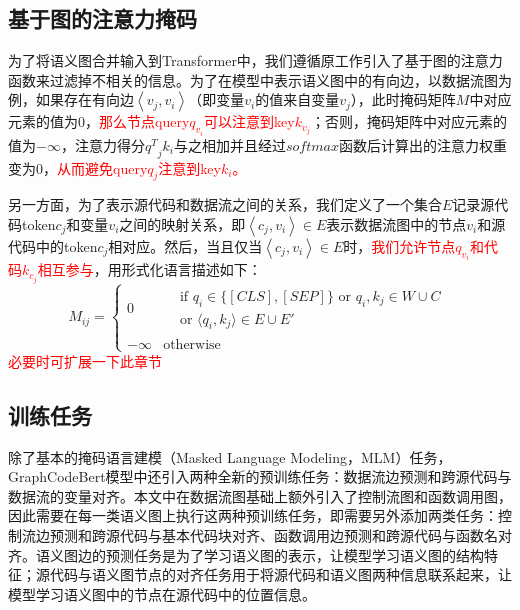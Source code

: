 \subsection{基于图的注意力掩码}
\label{sec:基于图的注意力掩码}
为了将语义图合并输入到Transformer中，我们遵循原工作\cite{guo2020graphcodebert}引入了基于图的注意力函数来过滤掉不相关的信息。为了在模型中表示语义图中的有向边，以数据流图为例，如果存在有向边$\left\langle v_j,v_i \right\rangle$（即变量$v_i$的值来自变量$v_j$），此时掩码矩阵$M$中对应元素的值为0，\textcolor{red}{那么节点query$q_{v_i}$可以注意到key$k_{v_j}$}；否则，掩码矩阵中对应元素的值为$-\infty$，注意力得分${q^T}_jk_i$与之相加并且经过$softmax$函数后计算出的注意力权重变为0，\textcolor{red}{从而避免query$q_j$注意到key$k_i$。}

另一方面，为了表示源代码和数据流之间的关系，我们定义了一个集合$E$记录源代码token$c_j$和变量$v_i$之间的映射关系，即$\left\langle c_j,v_i \right\rangle \in E$表示数据流图中的节点$v_i$和源代码中的token$c_j$相对应。然后，当且仅当$\left\langle c_j,v_i \right\rangle \in E$时，\textcolor{red}{我们允许节点$q_{v_i}$和代码$k_{c_j}$相互参与}，用形式化语言描述如下：
\begin{equation}
    M_{ij} =
    \begin{cases}
        0 & \begin{aligned}
               &\text{if } q_i \in \{[CLS], [SEP]\} \text{ or } q_i, k_j \in W \cup C \\
               &\text{or } \langle q_i, k_j \rangle \in E \cup E'
           \end{aligned} \\
        -\infty & \text{otherwise}
    \end{cases}
    \label{eq:mask}
\end{equation}
\textcolor{red}{必要时可扩展一下此章节}

\subsection{训练任务}
\label{sec:训练任务}
除了基本的掩码语言建模（Masked Language Modeling，MLM）任务\cite{devlin2018bert}，GraphCodeBert模型中还引入两种全新的预训练任务：数据流边预测和跨源代码与数据流的变量对齐。本文中在数据流图基础上额外引入了控制流图和函数调用图，因此需要在每一类语义图上执行这两种预训练任务，即需要另外添加两类任务：控制流边预测和跨源代码与基本代码块对齐、函数调用边预测和跨源代码与函数名对齐。语义图边的预测任务是为了学习语义图的表示，让模型学习语义图的结构特征；源代码与语义图节点的对齐任务用于将源代码和语义图两种信息联系起来，让模型学习语义图中的节点在源代码中的位置信息。

